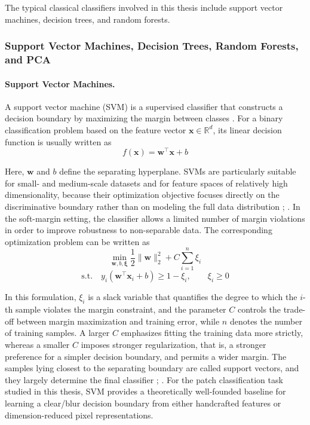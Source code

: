 \par The typical classical classifiers involved in this thesis include support
vector machines, decision trees, and random forests.

\subsubsection{Support Vector Machines, Decision Trees, Random Forests, and PCA}
\paragraph{Support Vector Machines.} A support vector machine (SVM) is a
supervised classifier that constructs a decision boundary by maximizing the
margin between classes \cite{cortes1995support}. For a binary classification
problem based on the feature vector $\mathbf{x}\in\mathbb{R}^d$, its linear
decision function is usually written as
\begin{equation}
    f(\mathbf{x})=\mathbf{w}^\top\mathbf{x}+b
    \label{eq:svm-decision-basic}
\end{equation}
\par Here, $\mathbf{w}$ and $b$ define the separating hyperplane. SVMs are
particularly suitable for small- and medium-scale datasets and for feature
spaces of relatively high dimensionality, because their optimization objective
focuses directly on the discriminative boundary rather than on modeling the full
data distribution \cite{cortes1995support};
\cite[pp.~187--404]{scholkopf2002learning}. In the soft-margin setting, the
classifier allows a limited number of margin violations in order to improve
robustness to non-separable data. The corresponding optimization problem can be
written as
\begin{equation}
    \min_{\mathbf{w},b,\boldsymbol{\xi}}
    \frac{1}{2}\|\mathbf{w}\|_2^2+C\sum_{i=1}^{n}\xi_i
    \label{eq:svm-objective-basic}
\end{equation}
\begin{equation}
    \text{s.t.}\quad
    y_i(\mathbf{w}^\top\mathbf{x}_i+b)\ge 1-\xi_i,\qquad
    \xi_i\ge 0
    \label{eq:svm-constraint-basic}
\end{equation}
\par In this formulation, $\xi_i$ is a slack variable that quantifies the degree
to which the $i$-th sample violates the margin constraint, and the parameter $C$
controls the trade-off between margin maximization and training error, while $n$
denotes the number of training samples. A larger $C$ emphasizes fitting the
training data more strictly, whereas a smaller $C$ imposes stronger
regularization, that is, a stronger preference for a simpler decision boundary,
and permits a wider margin. The samples lying closest to the separating boundary
are called support vectors, and they largely determine the final classifier
\cite{cortes1995support}; \cite[pp.~187--404]{scholkopf2002learning}. For the
patch classification task studied in this thesis, SVM provides a theoretically
well-founded baseline for learning a clear/blur decision boundary from either
handcrafted features or dimension-reduced pixel representations.

